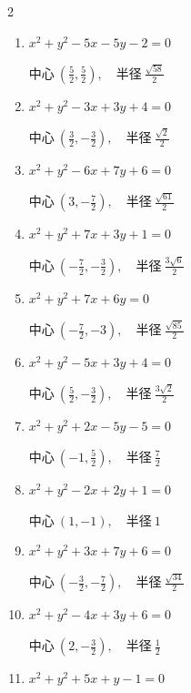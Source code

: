 \begin{multicols}{2}
\begin{enumerate}
        $\displaystyle 中心\: \left(2,3\right), \quad 半径 \ \sqrt{13}$

  \item $x^{2}+y^{2}-5x-5y-2=0$

        $\displaystyle 中心\: \left(\frac{5}{2},\frac{5}{2}\right), \quad 半径 \ \frac{\sqrt{58}}{2}$

  \item $x^{2}+y^{2}-3x+3y+4=0$

        $\displaystyle 中心\: \left(\frac{3}{2},-\frac{3}{2}\right), \quad 半径 \ \frac{\sqrt{2}}{2}$

  \item $x^{2}+y^{2}-6x+7y+6=0$

        $\displaystyle 中心\: \left(3,-\frac{7}{2}\right), \quad 半径 \ \frac{\sqrt{61}}{2}$

  \item $x^{2}+y^{2}+7x+3y+1=0$

        $\displaystyle 中心\: \left(-\frac{7}{2},-\frac{3}{2}\right), \quad 半径 \ \frac{3\sqrt{6}}{2}$

  \item $x^{2}+y^{2}+7x+6y=0$

        $\displaystyle 中心\: \left(-\frac{7}{2},-3\right), \quad 半径 \ \frac{\sqrt{85}}{2}$

  \item $x^{2}+y^{2}-5x+3y+4=0$

        $\displaystyle 中心\: \left(\frac{5}{2},-\frac{3}{2}\right), \quad 半径 \ \frac{3\sqrt{2}}{2}$

  \item $x^{2}+y^{2}+2x-5y-5=0$

        $\displaystyle 中心\: \left(-1,\frac{5}{2}\right), \quad 半径 \ \frac{7}{2}$

  \item $x^{2}+y^{2}-2x+2y+1=0$

        $\displaystyle 中心\: \left(1,-1\right), \quad 半径 \ 1$

  \item $x^{2}+y^{2}+3x+7y+6=0$

        $\displaystyle 中心\: \left(-\frac{3}{2},-\frac{7}{2}\right), \quad 半径 \ \frac{\sqrt{34}}{2}$

  \item $x^{2}+y^{2}-4x+3y+6=0$

        $\displaystyle 中心\: \left(2,-\frac{3}{2}\right), \quad 半径 \ \frac{1}{2}$

  \item $x^{2}+y^{2}+5x+y-1=0$


\end{enumerate}
\end{multicols}
